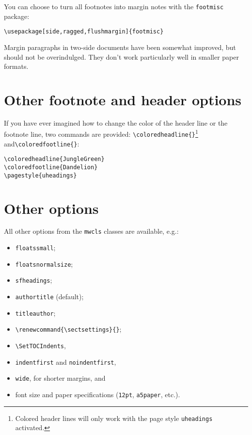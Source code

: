 \documentclass[withmarginpar,titleauthor,11pt]{mwart}
\begin{document}
You can choose to turn all footnotes into margin notes with the \texttt{footmisc} package:

\begin{verbatim}
\usepackage[side,ragged,flushmargin]{footmisc}
\end{verbatim}

Margin paragraphs in two-side documents have been somewhat improved, but should not be overindulged. They don't work particularly well in smaller paper formats. 

\section{Other footnote and header options}

If you have ever imagined how to change the color of the header line or the footnote line, two commands are provided: \verb|\coloredheadline{}|\footnote{Colored header lines will only work with the page style \texttt{uheadings} activated.} and\linebreak \verb|\coloredfootline{}|:

\begin{verbatim}
\coloredheadline{JungleGreen}
\coloredfootline{Dandelion}
\pagestyle{uheadings}
\end{verbatim}



\section{Other options}
All other options from the \texttt{mwcls} classes are available, e.g.:

\begin{multicols}{2}

\begin{itemize}
\item \texttt{floatssmall}; 
\item \texttt{floatsnormalsize}; 
\item \texttt{sfheadings};
\item \texttt{authortitle} (default); 
\item \texttt{titleauthor}; 
\item \verb|\renewcommand{\sectsettings}{}|; 
\item \verb|\SetTOCIndents|, 
\item \verb|indentfirst| and \verb|noindentfirst|, 
\item \verb|wide|, for shorter margins, and
\item font size and paper specifications (\texttt{12pt}, \texttt{a5paper}, etc.). 
\end{itemize}
\end{multicols}
\end{document}
